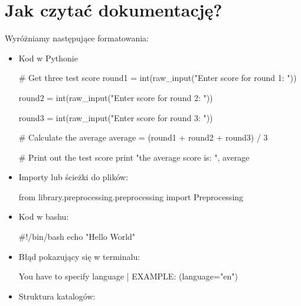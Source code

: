 \newpage
\section{Jak czytać dokumentację?}

Wyróżniamy następujące formatowania:

\begin{itemize}
\item Kod w Pythonie

\begin{python}
# Get three test score
round1 = int(raw_input("Enter score for round 1: "))

round2 = int(raw_input("Enter score for round 2: "))

round3 = int(raw_input("Enter score for round 3: "))
   
# Calculate the average
average = (round1 + round2 + round3) / 3

# Print out the test score
print "the average score is: ", average 

\end{python}

\item Importy lub ścieżki do plików:
\begin{import}
from library.preprocessing.preprocessing import Preprocessing
\end{import}

\item Kod w bashu:

\begin{bash}
#!/bin/bash
echo "Hello World"
\end{bash}

\item Błąd pokazujący się w terminalu:
\begin{consolerror}
You have to specify language | EXAMPLE: (language="en")
\end{consolerror}



\item Struktura katalogów:
\myspace
{}

\end{itemize}